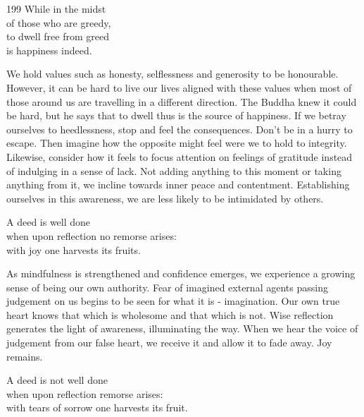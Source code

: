 
\begin{dhpVerse}{199}
\label{dhp-199}
While in the midst\\
of those who are greedy,\\
to dwell free from greed\\
is happiness indeed.
\end{dhpVerse}

\begin{dhpRefl}
We hold values such as honesty, selflessness and generosity to be honourable. However, it can be hard to live our lives aligned with these values when most of those around us are travelling in a different direction. The Buddha knew it could be hard, but he says that to dwell thus is the source of happiness. If we betray ourselves to heedlessness, stop and feel the consequences. Don't be in a hurry to escape. Then imagine how the opposite might feel were we to hold to integrity. Likewise, consider how it feels to focus attention on feelings of gratitude instead of indulging in a sense of lack. Not adding anything to this moment or taking anything from it, we incline towards inner peace and contentment. Establishing ourselves in this awareness, we are less likely to be intimidated by others.
\end{dhpRefl}


\begin{dhpVerse}{68}
\label{dhp-68}
A deed is well done\\
when upon reflection no remorse arises:\\
with joy one harvests its fruits.
\end{dhpVerse}

\begin{dhpRefl}
As mindfulness is strengthened and confidence emerges, we experience a growing sense of being our own authority. Fear of imagined external agents passing judgement on us begins to be seen for what it is - imagination. Our own true heart knows that which is wholesome and that which is not. Wise reflection generates the light of awareness, illuminating the way. When we hear the voice of judgement from our false heart, we receive it and allow it to fade away. Joy remains.
\end{dhpRefl}


\begin{dhpVerse}{67}
\label{dhp-67}
A deed is not well done\\
when upon reflection remorse arises:\\
with tears of sorrow one harvests its fruit.
\end{dhpVerse}

